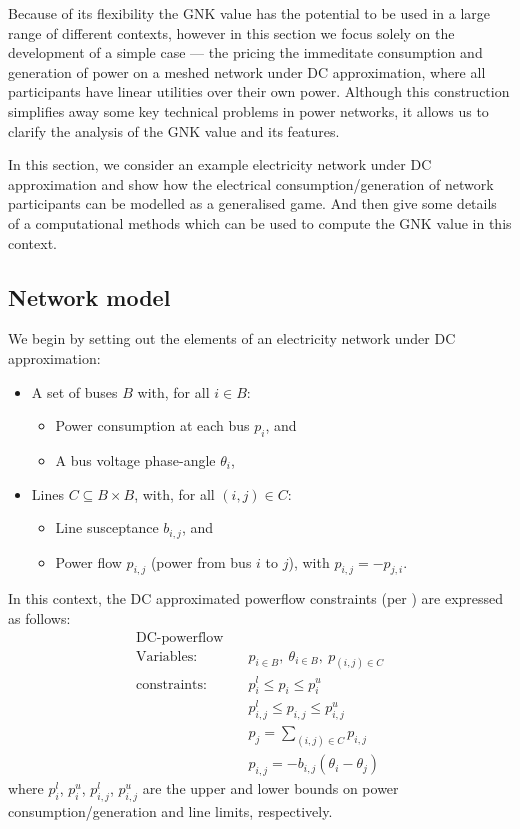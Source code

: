 Because of its flexibility the GNK value has the potential to be used in a large range of different contexts,
however in this section we focus solely on the development of a simple case --- the pricing the immeditate consumption and generation of power on a meshed network under DC approximation, where all participants have linear utilities over their own power.
Although this construction simplifies away some key technical problems in power networks, it allows us to clarify the analysis of the GNK value and its features.

In this section, we consider an example electricity network under DC approximation and show how the electrical consumption/generation of network participants can be modelled as a generalised game. And then give some details of a computational methods which can be used to compute the GNK value in this context.

\subsection{Network model}\label{sec:the_setup}


We begin by setting out the elements of an electricity network under DC approximation:
\begin{itemize}
    \item A set of buses $B$ with, for all $i\in B$:
    \begin{itemize} 
        \item Power consumption at each bus $p_i$, and 
        \item A bus voltage phase-angle $\theta_i$,
    \end{itemize}
    \item Lines $C\subseteq B\times B$, with, for all $(i,j)\in C$: 
        \begin{itemize} 
        \item Line susceptance $b_{i,j}$, and 
        \item Power flow $p_{i,j}$ (power from bus $i$ to $j$), with $p_{i,j}=-p_{j,i}$. 
    \end{itemize}
\end{itemize}
In this context, the DC approximated powerflow constraints (per \cite{Wang1}) are expressed as follows:
\begin{equation}
\label{dcopf1}
\begin{aligned}
\text{DC-powerflow} \quad& \\
\text{Variables:} \quad&  p_{i\in B},\ \theta_{i\in B},\ p_{(i,j)\in C} \\
\text{constraints:} \quad& p_i^{l}\le p_i \le p_i^{u} \\
&p_{i,j}^l \le p_{i,j} \le p_{i,j}^u \\
&p_j = \sum_{(i,j)\in C}p_{i,j}\\
&p_{i,j} = -b_{i,j}(\theta_i - \theta_j)
\end{aligned}
\end{equation}
where $p_i^{l}$, $p_i^{u}$, $p_{i,j}^l$, $p_{i,j}^u$ are the upper and lower bounds on power consumption/generation and line limits, respectively.

